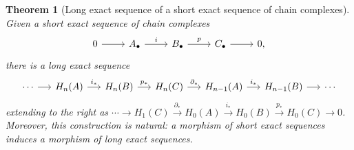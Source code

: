 \documentclass[12pt,a4paper,openany]{book}
\theoremstyle{definition}
\theoremstyle{plain}
\newtheorem{theorem}[definition]{Theorem}
\theoremstyle{remark}
\begin{document}
\begin{theorem}[Long exact sequence of a short exact sequence of chain complexes]\label{thm:les-chain}
Given a short exact sequence of chain complexes
\[
\begin{tikzcd}
  0 \ar[r] & A_\bullet \ar[r,"i"] & B_\bullet \ar[r,"p"] & C_\bullet \ar[r] & 0,
\end{tikzcd}
\]
there is a long exact sequence
\[
\begin{tikzcd}[column sep=1.4em]
  \cdots \ar[r]
  & H_n(A) \ar[r,"i_*"]
  & H_n(B) \ar[r,"p_*"]
  & H_n(C) \ar[r,"\partial_*"]
  & H_{n-1}(A) \ar[r,"i_*"]
  & H_{n-1}(B) \ar[r]
  & \cdots
\end{tikzcd}
\]
extending to the right as
$\cdots\to H_1(C)\xrightarrow{\partial_*} H_0(A)\xrightarrow{i_*} H_0(B)
\xrightarrow{p_*} H_0(C)\to 0$.
Moreover, this construction is natural: a morphism of short exact sequences
induces a morphism of long exact sequences.
\end{theorem}
\end{document}
